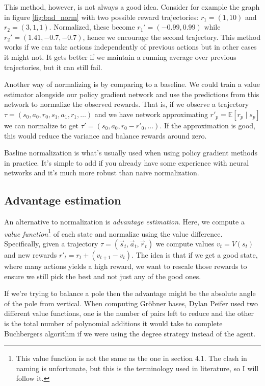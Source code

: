 \documentclass{article}
\theoremstyle{changedot}
\theoremstyle{changedotbreak}
\theoremstyle{nonumberplain}
\newcommand{\m}{\mathbb}
\begin{document}
This method, however, is not always a good idea. Consider for example the graph in figure \ref{fig:bad_norm} with two possible reward trajectories: $r_{1} = (1, 10)$ and $r_{2} = (3, 1, 1)$. Normalized, these become $r_{1}' = (-0.99, 0.99)$ while $r_{2}' = (1.41, -0.7, -0.7)$, hence we encourage the second trajectory. This method works if we can take actions independently of previous actions but in other cases it might not. It gets better if we maintain a running average over previous trajectories, but it can still fail.

Another way of normalizing is by comparing to a baseline. We could train a value estimator alongside our policy gradient network and use the predictions from this network to normalize the observed rewards. That is, if we observe a trajectory $\tau = (s_{0}, a_{0}, r_{0}, s_{1}, a_{1}, r_{1}, \dots)$ and we have network approximating $r'_{p} = \m E[r_{p} \mid s_{p}]$ we can normalize to get $\tau' = (s_{0}, a_{0}, r_{0} - r'_{0}, \dots)$. If the approximation is good, this would reduce the variance and balance rewards around zero.

Basline normalization is what's usually used when using policy gradient methods in practice. It's simple to add if you already have some experience with neural networks and it's much more robust than naive normalization.


\subsection{Advantage estimation}
An alternative to normalization is \emph{advantage estimation}. Here, we compute a \emph{value function}\footnote{This value function is not the same as the one in section 4.1. The clash in naming is unfortunate, but this is the terminology used in literature, so I will follow it.} of each state and normalize using the value difference. Specifically, given a trajectory $\tau = (\overrightarrow s_{t}, \overrightarrow a_{t}, \overrightarrow r_{t})$ we compute values $v_{t} = V(s_{t})$ and new rewards $r'_{t} = r_{t} + (v_{t+1} - v_{t})$. The idea is that if we get a good state, where many actions yields a high reward, we want to rescale those rewards to ensure we still pick the best and not just any of the good ones.

If we're trying to balance a pole then the advantage might be the absolute angle of the pole from vertical. When computing Gröbner bases, Dylan Peifer used two different value functions, one is the number of pairs left to reduce and the other is the total number of polynomial additions it would take to complete Buchbergers algorithm if we were using the degree strategy instead of the agent. 
\end{document}
